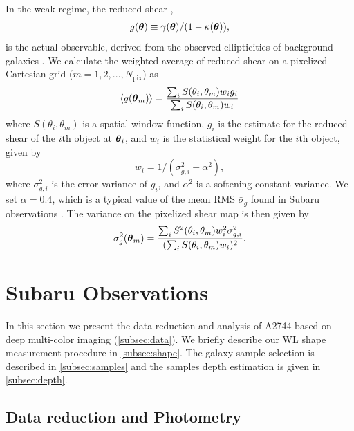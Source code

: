 \documentclass[iop,twocolumn]{emulateapj}
\def\btheta{\mbox{\boldmath $\theta$}}
\begin{document}
In the weak regime, the reduced shear \citep[see, e.g.,][]{Bartelmann01},
\begin{equation}
\label{eq:g}
g(\btheta) \equiv \gamma(\btheta)/(1-\kappa(\btheta)),
\end{equation}
is the actual observable, derived from the observed ellipticities of background galaxies \citep{KSB}.
We calculate the weighted average of reduced shear 
on a pixelized Cartesian grid
($m=1,2,...,N_\mathrm{pix}$) as
\begin{equation}
\label{eq:ggrid}
 \langle g(\btheta_m)\rangle = \frac{\sum_{i} S(\theta_i,\theta_m) w_i g_i}{\sum_{i} S(\theta_i,\theta_m) w_i}
\end{equation}
where $S(\theta_i,\theta_m)$ is a spatial window function, $g_i$ is the estimate for the reduced shear of the $i$th object at $\btheta_i$, and  $w_i$ is the statistical  weight for the $i$th object, given by
\begin{equation}
\label{eq:w}
 w_i=1/(\sigma_{g,i}^2+\alpha^2),
\end{equation}
where $\sigma_{g,i}^2$ is the error variance of $g_i$, and $\alpha^2$ is a softening constant variance. We set $\alpha=0.4$, which is a typical value of the mean RMS $\bar{\sigma}_g$ found in Subaru
observations \citep[e.g.,][]{UB2008,Okabe2010}.
%
The variance on the pixelized shear map is then given by \citet{Umetsu+2009,Umetsu2015}
\begin{equation}
\label{eq:siggrid}
 \sigma_{g}^2(\btheta_m) = \frac{\sum_{i} S^2(\theta_i,\theta_m) w^2_i \sigma_{g,i}^2}{(\sum_{i} S(\theta_i,\theta_m) w_i)^2}.
\end{equation}





\section{Subaru Observations}
\label{sec:data}

In this section we present the
data reduction and analysis of A2744 based on deep 
multi-color imaging (\autoref{subsec:data}).  
We briefly describe our WL shape measurement procedure in \autoref{subsec:shape}.
The galaxy sample selection is described in \autoref{subsec:samples} and the samples depth estimation is given in \autoref{subsec:depth}.
% 
% 
\subsection{Data reduction and Photometry}
\label{subsec:data}
\end{document}

